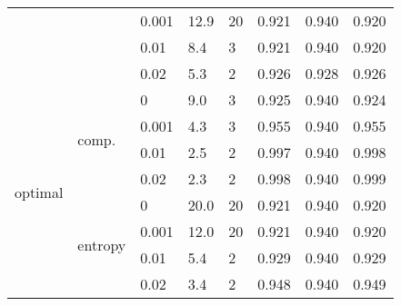 \begin{table}[]
\begin{tabularx}{\textwidth}{|X|X|X|X|X|X|X|X|}
		&               & 0.001     & 12.9                   & 20                       & 0.921    & 0.940       & 0.920       \\ \cline{3-8}
		&               & 0.01      & 8.4                    & 3                        & 0.921    & 0.940       & 0.920       \\ \cline{3-8}
		&               & 0.02      & 5.3                    & 2                        & 0.926    & 0.928       & 0.926       \\ \hline
		\multirow{8}{*}{optimal} & \multirow{4}{*}{comp.} & 0         & 9.0                    & 3                        & 0.925    & 0.940       & 0.924       \\ \cline{3-8}
		&               & 0.001     & 4.3                    & 3                        & 0.955    & 0.940       & 0.955       \\ \cline{3-8}
		&               & 0.01      & 2.5                    & 2                        & 0.997    & 0.940       & 0.998       \\ \cline{3-8}
		&               & 0.02      & 2.3                    & 2                        & 0.998    & 0.940       & 0.999       \\ \cline{2-8}
		& \multirow{4}{*}{entropy} & 0         & 20.0                   & 20                       & 0.921    & 0.940       & 0.920       \\ \cline{3-8}
		&               & 0.001     & 12.0                   & 20                       & 0.921    & 0.940       & 0.920       \\ \cline{3-8}
		&               & 0.01      & 5.4                    & 2                        & 0.929    & 0.940       & 0.929       \\ \cline{3-8}
		&               & 0.02      & 3.4                    & 2                        & 0.948    & 0.940       & 0.949 \\ \hline
	\end{tabularx}
\end{table}
